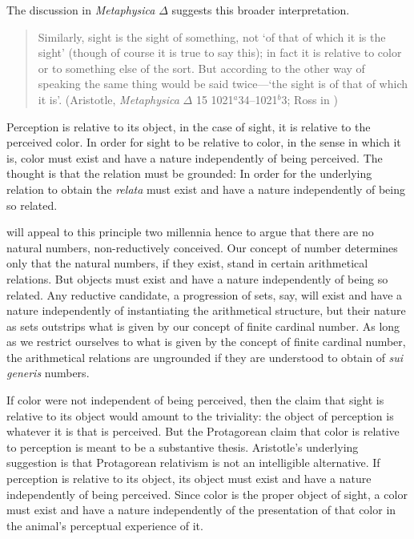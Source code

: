 The discussion in \emph{Metaphysica} \( \Delta \) suggests this broader interpretation.
\begin{quote}
	Similarly, sight is the sight of something, not `of that of which it is the sight' (though of course it is true to say this); in fact it is relative to color or to something else of the sort. But according to the other way of speaking the same thing would be said twice---`the sight is of that of which it is'. (Aristotle, \emph{Metaphysica} \( \Delta \) 15 1021\( ^{a} \)34--1021\( ^{b} \)3; Ross in \citealt[76]{Barnes:1984kx})
\end{quote}
Perception is relative to its object, in the case of sight, it is relative to the perceived color. In order for sight to be relative to color, in the sense in which it is, color must exist and have a nature independently of being perceived. The thought is that the relation must be grounded: In order for the underlying relation to obtain the \emph{relata} must exist and have a nature independently of being so related.

\citet{Benacerraf:1965sh} will appeal to this principle two millennia hence to argue that there are no natural numbers, non-reductively conceived. Our concept of number determines only that the natural numbers, if they exist, stand in certain arithmetical relations. But objects must exist and have a nature independently of being so related. Any reductive candidate, a progression of sets, say, will exist and have a nature independently of instantiating the arithmetical structure, but their nature as sets outstrips what is given by our concept of finite cardinal number. As long as we restrict ourselves to what is given by the concept of finite cardinal number, the arithmetical relations are ungrounded if they are understood to obtain of \emph{sui generis} numbers.

If color were not independent of being perceived, then the claim that sight is relative to its object would amount to the triviality: the object of perception is whatever it is that is perceived. But the Protagorean claim that color is relative to perception is meant to be a substantive thesis. Aristotle's underlying suggestion is that Protagorean relativism is not an intelligible alternative. If perception is relative to its object, its object must exist and have a nature independently of being perceived. Since color is the proper object of sight, a color must exist and have a nature independently of the presentation of that color in the animal's perceptual experience of it.

